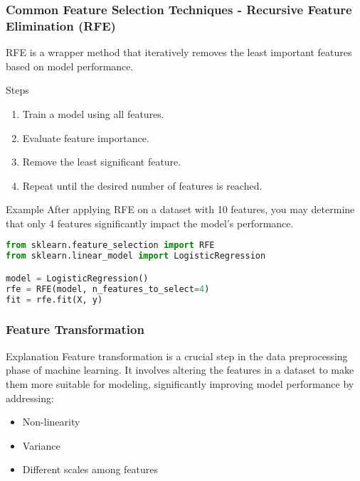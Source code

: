 \documentclass[aspectratio=169]{beamer}
\begin{document}
\begin{frame}[fragile]
    \frametitle{Common Feature Selection Techniques - Recursive Feature Elimination (RFE)}
    RFE is a wrapper method that iteratively removes the least important features based on model performance.

    \begin{block}{Steps}
        \begin{enumerate}
            \item Train a model using all features.
            \item Evaluate feature importance.
            \item Remove the least significant feature.
            \item Repeat until the desired number of features is reached.
        \end{enumerate}
    \end{block}

    \begin{block}{Example}
        After applying RFE on a dataset with 10 features, you may determine that only 4 features significantly impact the model's performance.
    \end{block}

    \begin{lstlisting}[language=Python]
from sklearn.feature_selection import RFE
from sklearn.linear_model import LogisticRegression

model = LogisticRegression()
rfe = RFE(model, n_features_to_select=4)
fit = rfe.fit(X, y)
    \end{lstlisting}
\end{frame}

\begin{frame}[fragile]
  \frametitle{Feature Transformation}
  \begin{block}{Explanation}
    Feature transformation is a crucial step in the data preprocessing phase of machine learning. 
    It involves altering the features in a dataset to make them more suitable for modeling, significantly improving model performance by addressing:
    \begin{itemize}
      \item Non-linearity
      \item Variance
      \item Different scales among features
    \end{itemize}
  \end{block}
\end{frame}
\end{document}
